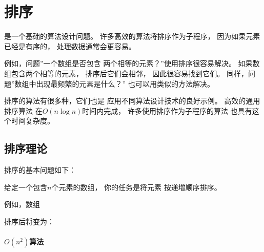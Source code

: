 \chapter{排序}


是一个基础的算法设计问题。
许多高效的算法将排序作为子程序，
因为如果元素已经是有序的，
处理数据通常会更容易。

例如，问题''一个数组是否包含
两个相等的元素？''使用排序很容易解决。
如果数组包含两个相等的元素，
排序后它们会相邻，
因此很容易找到它们。
同样，问题''数组中出现最频繁的元素是什么？''
也可以用类似的方法解决。

排序的算法有很多种，它们也是
应用不同算法设计技术的良好示例。
高效的通用排序算法
在$O(n \log n)$时间内完成，
许多使用排序作为子程序的算法
也具有这个时间复杂度。

\section{排序理论}

排序的基本问题如下：
\begin{framed}
\noindent
给定一个包含$n$个元素的数组，
你的任务是将元素
按递增顺序排序。
\end{framed}
\noindent
例如，数组
\begin{center}
\end{center}
排序后将变为：
\begin{center}
\end{center}

\subsubsection{$O(n^2)$算法}


